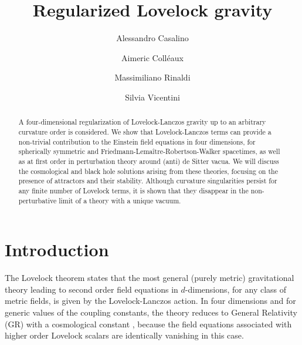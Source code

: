 \documentclass[aps,prd,preprint,nofootinbib]{revtex4-1}
\begin{document}
\author{Alessandro Casalino}
\author{Aimeric Coll\'eaux}
\author{Massimiliano Rinaldi}
\author{Silvia Vicentini}
\title{Regularized Lovelock gravity}
\begin{abstract}
A four-dimensional regularization of Lovelock-Lanczos gravity up to an arbitrary curvature order is considered. We show that Lovelock-Lanczos terms can provide a non-trivial contribution to the Einstein field equations in four dimensions, for spherically symmetric and Friedmann-Lema\^{i}tre-Robertson-Walker spacetimes, as well as at first order in perturbation theory around (anti) de Sitter vacua. We will discuss the cosmological and black hole solutions arising from these theories, focusing on the presence of attractors and their stability. Although curvature singularities persist for any finite number of Lovelock terms, it is shown that they disappear in the non-perturbative limit of a theory with a unique vacuum.
\end{abstract}

\allowdisplaybreaks[1]

\maketitle

\section{Introduction}

The Lovelock theorem \cite{Lovelock:1971vz} states that the most general (purely metric) gravitational theory leading to second order field equations in $d$-dimensions, for any class of metric fields, is given by the Lovelock-Lanczos action. In four dimensions and for generic values of the coupling constants, the theory reduces to General Relativity (GR) with a cosmological constant \cite{Lovelock:1972vz}, because the field equations associated with higher order Lovelock scalars are identically vanishing in this case.
\end{document}
